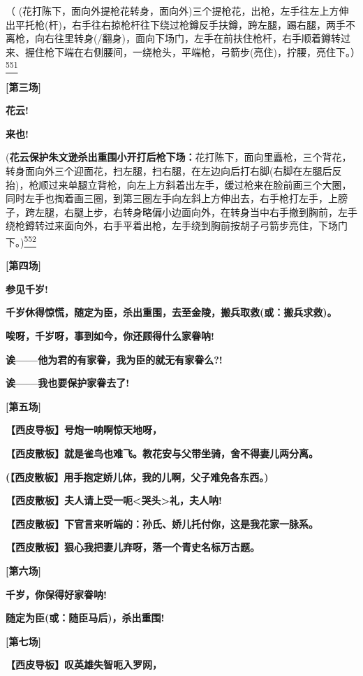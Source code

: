 （
(花打陈下，面向外提枪花转身，面向外)三个提枪花，出枪，左手往左上方伸出平托枪(杆)，右手往右掠枪杆往下绕过枪鐏反手扶鐏，跨左腿，踢右腿，两手不离枪，向右往里转身(/翻身)，面向下场门，左手在前扶住枪杆，右手顺着鐏转过来、握住枪下端在右侧腰间，一绕枪头，平端枪，弓箭步(亮住)，拧腰，亮住下。）\protect\hyperlink{fn551}{\textsuperscript{551}}

\textbf{{[}第三场{]}}

\textbf{花云!}

\textbf{来也!}

(\textbf{花云保护朱文逊杀出重围小开打后枪下场：}花打陈下，面向里矗枪，三个背花，转身面向外三个迎面花，扫左腿，扫右腿，在左边向后打右脚(右脚在左腿后反抬)，枪顺过来单腿立背枪，向左上方斜着出左手，缓过枪来在脸前画三个大圈，同时左手也掏着画三圈，到第三圈左手向左斜上方伸出去，右手枪打左手，上膀子，跨左腿，右腿上步，右转身略偏小边面向外，在转身当中右手撤到胸前，左手绕枪鐏转过来面向外，右手平着出枪，左手绕到胸前按胡子弓箭步亮住，下场门下。)\protect\hyperlink{fn552}{\textsuperscript{552}}

\textbf{{[}第四场{]}}

\textbf{参见千岁!}

\textbf{千岁休得惊慌，随定为臣，杀出重围，去至金陵，搬兵取救(或：搬兵求救)。}

\textbf{唉呀，千岁呀，事到如今，你还顾得什么家眷呐!}

\textbf{诶------他为君的有家眷，我为臣的就无有家眷么?!}

\textbf{诶------我也要保护家眷去了!}

\textbf{{[}第五场{]}}

\textbf{【西皮导板】号炮一响啊惊天地呀，}

\textbf{【西皮散板】就是雀鸟也难飞。教花安与父带坐骑，舍不得妻儿两分离。}

\textbf{(【西皮散板】用手抱定娇儿体，我的儿啊，父子难免各东西。)}

\textbf{【西皮散板】夫人请上受一呃\textless{}哭头\textgreater{}礼，夫人呐!}

\textbf{【西皮散板】下官言来听端的：孙氏、娇儿托付你，这是我花家一脉系。}

\textbf{【西皮散板】狠心我把妻儿弃呀，落一个青史名标万古题。}

\textbf{{[}第六场{]}}

\textbf{千岁，你保得好家眷呐!}

\textbf{随定为臣(或：随臣马后)，杀出重围!}

\textbf{{[}第七场{]}}

\textbf{【西皮导板】叹英雄失智呃入罗网，}

